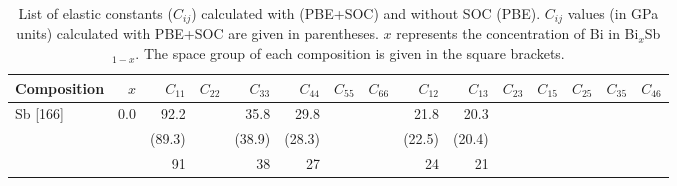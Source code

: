\documentclass[twocolumn,superscriptaddress,nofootinbib,floatfix,aps,showpacs,prb,citeautoscript,reprint]{revtex4-1}
\begin{document}
\begin{table*}[hbt!]
\centering
\caption{List of elastic constants ($C_{ij}$) calculated with (PBE+SOC) and without SOC (PBE). $C_{ij}$ values (in GPa units) calculated with PBE+SOC are given in parentheses. $x$ represents the concentration of Bi in  Bi$_{x}$Sb$_{1-x}$. The space group of each composition is given in the square brackets. \\ }
\begin{adjustbox}{width=1.0\textwidth, center=\textwidth } 
    \begin{threeparttable}
    \setlength{\arrayrulewidth}{0.3mm}
\setlength{\tabcolsep}{6pt}
\renewcommand{\arraystretch}{1}
\begin{tabular}{lrrrrrrrrrrrrrr}
  \hline
  {\bf Composition} & $x$ & $C_{11}$ & $C_{22}$ & $C_{33}$ & $C_{44}$ & $C_{55}$ & $C_{66}$ & $C_{12}$ & $C_{13}$ & $C_{23}$ & $C_{15}$ & $C_{25}$ &  $C_{35}$ &$C_{46}$  \\
  \hline
\multirow{3}{*}{Sb [166]}  & \multirow{3}{*}{0.0} & 92.2 &  & 35.8 & 29.8 &  &   & 21.8	& 20.3 & & & & & \\
				& 		       & (89.3) &  & (38.9) & (28.3) &  &  & (22.5) & (20.4) & & & & & \\ 
\hspace{1cm} Theory \tnote{a}		& 		       & 91 &  & 38 & 27 &  &  & 24 & 21 & & & & & \\ 


\end{tabular}
\end{threeparttable}
\end{adjustbox}
\end{table*}
\end{document}
